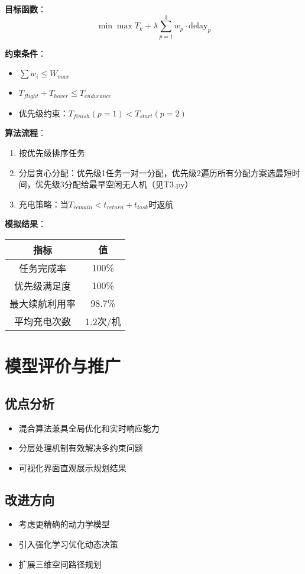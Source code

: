 \documentclass[12pt,fontset=adobe]{ctexart}
\begin{document}
\textbf{目标函数}：
\begin{equation}
\min \max T_k + \lambda \sum_{p=1}^3 w_p \cdot \text{delay}_p
\end{equation}

\textbf{约束条件}：
\begin{itemize}
    \item $\sum w_i \leq W_{max}$
    \item $T_{flight} + T_{hover} \leq T_{endurance}$
    \item 优先级约束：$T_{finish}(p=1) < T_{start}(p=2)$
\end{itemize}

\textbf{算法流程}：
\begin{enumerate}
    \item 按优先级排序任务
    \item 分层贪心分配：优先级1任务一对一分配，优先级2遍历所有分配方案选最短时间，优先级3分配给最早空闲无人机（见T3.py）
    \item 充电策略：当$T_{remain} < t_{return} + t_{task}$时返航
\end{enumerate}

\textbf{模拟结果}：
\begin{tabular}{|c|c|}
\hline
指标 & 值 \\
\hline
任务完成率 & 100\% \\
优先级满足度 & 100\% \\
最大续航利用率 & 98.7\% \\
平均充电次数 & 1.2次/机 \\
\hline
\end{tabular}

\section{模型评价与推广}

\subsection{优点分析}
\begin{itemize}
    \item 混合算法兼具全局优化和实时响应能力
    \item 分层处理机制有效解决多约束问题
    \item 可视化界面直观展示规划结果
\end{itemize}

\subsection{改进方向}
\begin{itemize}
    \item 考虑更精确的动力学模型
    \item 引入强化学习优化动态决策
    \item 扩展三维空间路径规划
\end{itemize}
\end{document}
